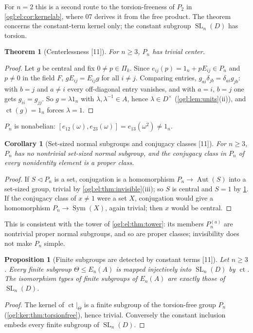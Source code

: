 \documentclass[11pt,oneside]{article}
\numberwithin{equation}{section}
\newtheorem{theorem}{Theorem}[section]
\newtheorem{proposition}[proposition]{Proposition}
\newtheorem{corollary}[corollary]{Corollary}
\theoremstyle{definition}
\theoremstyle{remark}
\newcommand{\ct}{\operatorname{ct}}
\newcommand{\SL}{\operatorname{SL}}
\newcommand{\Sym}{\operatorname{Sym}}
\newcommand{\Aut}{\operatorname{Aut}}
\newcommand{\src}[1]{\textup{\textsf{\small[#1]}}}
\begin{document}
For $n=2$ this is a second route to the torsion-freeness of $P_2$ in
\cref{ogl:el:cor:kernelab}, where 07 derives it from the free product. The
theorem concerns the constant-term kernel only; the constant subgroup
$\SL_n(D)$ has torsion.

\begin{theorem}[Centerlessness \src{11}]\label{ogl:ker:thm:center}
For $n\ge3$, $P_n$ has trivial center.
\end{theorem}
\begin{proof}
Let $g$ be central and fix $0\ne p\in\Pi_k$. Since $e_{ij}(p)=1_n+pE_{ij}\in P_n$
and $p\ne0$ in the field $F$, $gE_{ij}=E_{ij}g$ for all $i\ne j$. Comparing
entries, $g_{ai}\delta_{jb}=\delta_{ai}g_{jb}$: with $b=j$ and $a\ne i$ every
off-diagonal entry vanishes, and with $a=i$, $b=j$ one gets $g_{ii}=g_{jj}$. So
$g=\lambda1_n$ with $\lambda,\lambda^{-1}\in A$, hence $\lambda\in D^\times$
(\cref{ogl:lem:units}(ii)), and $\ct(g)=1_n$ forces $\lambda=1$.
\end{proof}

$P_n$ is nonabelian: $[e_{12}(\omega),e_{23}(\omega)]=e_{13}(\omega^2)\ne1_n$.

\begin{corollary}[Set-sized normal subgroups and conjugacy classes \src{11}]\label{ogl:ker:cor:normalsets}
For $n\ge3$, $P_n$ has no nontrivial set-sized normal subgroup, and the
conjugacy class in $P_n$ of every nonidentity element is a proper class.
\end{corollary}
\begin{proof}
If $S\lhd P_n$ is a set, conjugation is a homomorphism $P_n\to\Aut(S)$ into a
set-sized group, trivial by \cref{ogl:el:thm:invisible}(iii); so $S$ is central
and $S=1$ by \cref{ogl:ker:thm:center}. If the conjugacy class of $x\ne1$ were a
set $X$, conjugation would give a homomorphism $P_n\to\Sym(X)$, again trivial;
then $x$ would be central.
\end{proof}

This is consistent with the tower of \cref{ogl:el:thm:tower}: its members
$P_n^{(a)}$ are nontrivial proper normal subgroups, and so are proper classes;
invisibility does not make $P_n$ simple.

\begin{proposition}[Finite subgroups are detected by constant terms \src{11}]\label{ogl:ker:prop:finitesubgroups}
Let $n\ge3$. Every finite subgroup $\Theta\le E_n(A)$ is mapped injectively into
$\SL_n(D)$ by $\ct$. The isomorphism types of finite subgroups of $E_n(A)$ are
exactly those of $\SL_n(D)$.
\end{proposition}
\begin{proof}
The kernel of $\ct|_\Theta$ is a finite subgroup of the torsion-free group
$P_n$ (\cref{ogl:ker:thm:torsionfree}), hence trivial. Conversely the constant
inclusion embeds every finite subgroup of $\SL_n(D)$.
\end{proof}
\end{document}
